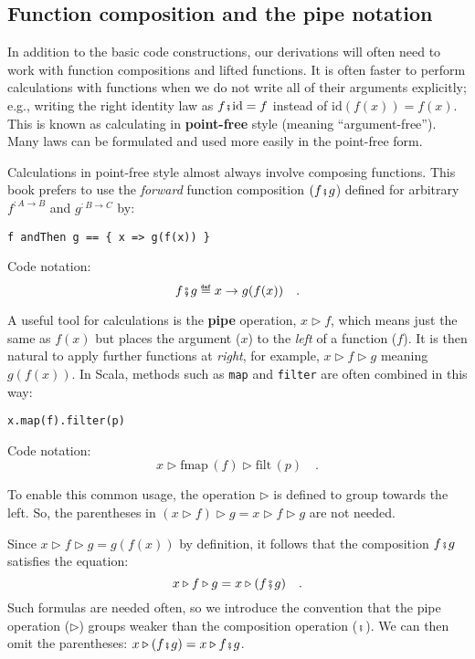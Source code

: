 \subsection{Function composition and the pipe notation}

In addition to the basic code constructions, our derivations will
often need to work with function compositions and lifted functions.
It is often faster to perform calculations with functions when we
do not write all of their arguments explicitly; e.g., writing the
right identity law as $f\bef\text{id}=f$ instead of $\text{id}\left(f(x)\right)=f(x)$.
This is known as calculating in \textbf{point-free}
style (meaning \textsf{``}argument-free\textsf{''}). Many laws can be formulated and
used more easily in the point-free form. 

Calculations in point-free style almost always involve composing functions.
This book prefers to use the \emph{forward} function composition $(f\bef g$)
defined for arbitrary $f^{:A\rightarrow B}$ and $g^{:B\rightarrow C}$
by:
\begin{lstlisting}
f andThen g == { x => g(f(x)) }
\end{lstlisting}
Code notation:
\[
f\bef g\triangleq x\rightarrow g(f(x))\quad.
\]

A useful tool for calculations is the \textbf{pipe}
operation, $x\triangleright f$, which means just the same as $f(x)$
but places the argument ($x$) to the \emph{left} of a function ($f$).
It is then natural to apply further functions at \emph{right}, for
example, $x\triangleright f\triangleright g$ meaning $g(f(x))$.
In Scala, methods such as \lstinline!map! and \lstinline!filter!
are often combined in this way:
\begin{lstlisting}
x.map(f).filter(p)
\end{lstlisting}
Code notation:
\[
x\triangleright\text{fmap}\,(f)\triangleright\text{filt}\,(p)\quad.
\]

To enable this common usage, the operation $\triangleright$ is defined
to group towards the left. So, the parentheses in $(x\triangleright f)\triangleright g=x\triangleright f\triangleright g$
are not needed.

Since $x\triangleright f\triangleright g=g(f(x))$ by definition,
it follows that the composition $f\bef g$ satisfies the equation:
\[
x\triangleright f\triangleright g=x\triangleright(f\bef g)\quad.
\]
Such formulas are needed often, so we introduce the convention that
the pipe operation ($\triangleright$) groups weaker than the composition
operation ($\bef$). We
can then omit the parentheses: $x\triangleright(f\bef g)=x\triangleright f\bef g$. 

